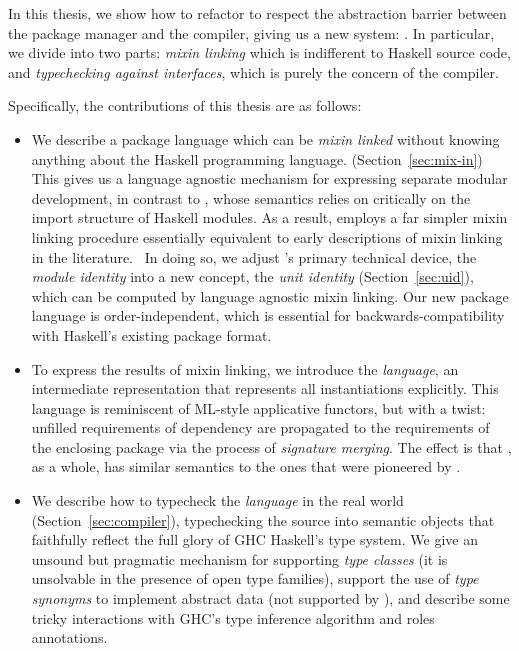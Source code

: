 In this thesis, we show how to refactor
\OldBackpack{} to respect the abstraction barrier between the package
manager and the compiler, giving us a new system: \Backpack{}.  In
particular, we divide \Backpack{} into two parts: \emph{mixin linking}
which is indifferent to Haskell source code, and \emph{typechecking against
interfaces}, which is purely the concern of the compiler.

Specifically, the contributions of this thesis are as follows:
\begin{itemize}

    \item We describe a package language which can be \emph{mixin
    linked} without knowing anything about the Haskell programming
    language. (Section~\ref{sec:mix-in})  This gives us a language agnostic mechanism for
    expressing separate modular development, in contrast to
    \OldBackpack{}, whose semantics relies on critically on the import structure
    of Haskell modules.  As a result, \Backpack{}
    employs a far simpler mixin linking procedure essentially equivalent
    to early descriptions of mixin linking in the literature.~\cite{cardelli:linksets}
    In doing so, we adjust \OldBackpack{}'s primary technical device,
    the \emph{module identity} into a new concept, the \emph{unit identity} (Section~\ref{sec:uid}),
    which can be computed by language agnostic mixin linking.
    Our new package language is order-independent, which is
    essential for backwards-compatibility with Haskell's existing
    package format.

    \item To express the results of mixin linking, we introduce the
    \emph{\unit{} language}, an intermediate representation that
    represents all instantiations explicitly.  This language is reminiscent of
    ML-style applicative functors, but with a twist:
    unfilled requirements of dependency are propagated to the requirements
    of the enclosing package via the process of \emph{signature merging}.
    The effect is that \Backpack{}, as a whole, has similar
    semantics to the ones that were pioneered by \OldBackpack{}.

    \item We describe how to typecheck the \emph{\unit{} language} in the
    real world (Section~\ref{sec:compiler}), typechecking the source into semantic objects that
    faithfully reflect the full glory of GHC Haskell's type system.
    We give an unsound but pragmatic mechanism for supporting \emph{type classes}
    (it is unsolvable in the presence of open type families), support
    the use of \emph{type synonyms} to implement abstract data
    (not supported by \OldBackpack{}), and describe
    some tricky interactions with GHC's type inference algorithm and
    roles annotations.


\end{itemize}
